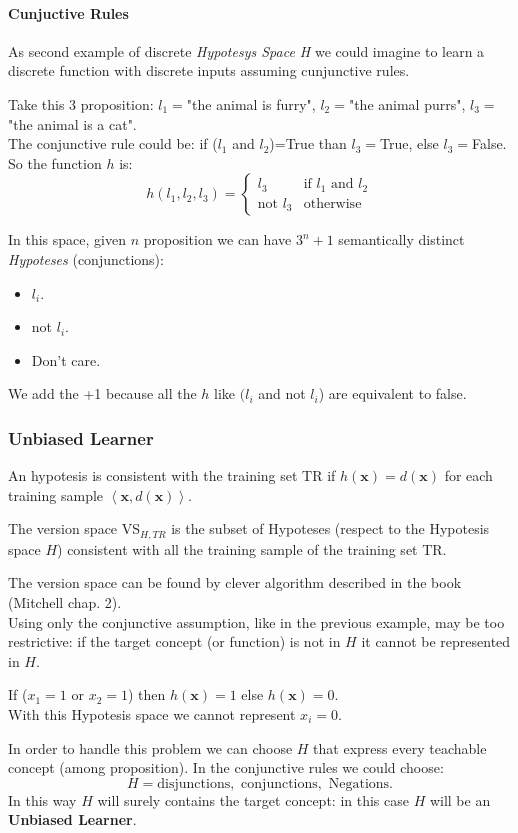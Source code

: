\documentclass[../main.tex]{subfiles}
\begin{document}
\paragraph{Cunjuctive Rules}%
As second example of discrete \textit{Hypotesys Space H} we could imagine to learn a discrete function with discrete inputs assuming cunjunctive rules.
\begin{example}
Take this 3 proposition: $l_1 = $"the animal is furry", $l_2 = $"the animal purrs", $l_3=$"the animal is a cat". \\
The conjunctive rule could be: if ($l_1$ and $l_2$)=True than $l_3=$True, else $l_3=$False. \\
So the function $h$ is:
\[
    h(l_1, l_2, l_3) = 
    \begin{cases}
	l_3 & \text{if } l_1 \text{ and } l_2\\
	\text{not }l_3 & \text{otherwise}
    \end{cases}
\] 
\end{example}
In this space, given $n$ proposition we can have $3^n + 1$ semantically distinct \textit{Hypoteses} (conjunctions): 
\begin{itemize}
    \item $l_i$.
    \item not $l_i$.
    \item Don't care.
\end{itemize}
We add the +1 because all the $h$ like $(l_i$ and not $l_i$) are equivalent to false.

\subsubsection{Unbiased Learner}%
\begin{definition}
    An hypotesis is consistent with the training set TR if $h(\boldsymbol{x}) = d(\boldsymbol{x})$ for each training sample $\left<\boldsymbol{x}, d(\boldsymbol{x}) \right>$.
\end{definition}
\begin{definition}
    The version space VS$_{H, TR}$ is the subset of Hypoteses (respect to the Hypotesis space $H$) consistent with all the training sample of the training set TR.
\end{definition}
The version space can be found by clever algorithm described in the book (Mitchell chap. 2).\\
Using only the conjunctive assumption, like in the previous example, may be too restrictive: if the target concept (or function) is not in $H$ it cannot be represented in $H$.
\begin{example}
    If ($x_1 = 1$ or $x_2 = 1$) then $h(\boldsymbol{x})=1$ else $h(\boldsymbol{x})= 0$.\\
    With this Hypotesis space we cannot represent $x_i = 0$.
\end{example}
In order to handle this problem we can choose $H$ that express every teachable concept (among proposition). In the conjunctive rules we could choose:
\[
    H = \text{disjunctions}, \text{ conjunctions}, \text{ Negations}.
\] 
In this way $H$ will surely contains the target concept: in this case $H$ will be an \textbf{Unbiased Learner}. 
\end{document}
